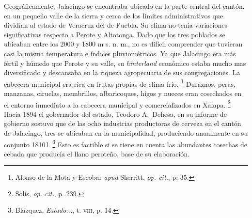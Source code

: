 \documentclass[14pt,twoside,final]{extbook} %
\let\oldfootnote\footnote
\renewcommand\footnote[1]{%
\oldfootnote{\hspace{1mm}#1}}
\begin{document}
Geográficamente, Jalacingo se encontraba ubicado en la parte central del cantón, en un pequeño valle de la sierra y cerca de los límites administrativos que dividían al estado de Veracruz del de Puebla. Su clima no tenía variaciones significativas respecto a Perote y Altotonga. Dado que los tres poblados se ubicaban entre los 2000 y 1800 m s. n. m., no es difícil comprender que tuvieran casi la misma temperatura e índices pluviométricos. Ya que Jalacingo era más fértil y húmedo que Perote y su valle, su \emph{hinterland} económico estaba mucho mas diversificado y descansaba en la riqueza agropecuaria de sus congregaciones. La cabecera municipal era rica en frutas propias de clima frío.\footnote{Alonso de la Mota y Escobar \emph{apud} Skerritt, \emph{op. cit.}, p. 35.} Duraznos, peras, manzanas, ciruelas, membrillos, albaricoques, higos y nueces eran cosechados en el entorno inmediato a la cabecera municipal y comercializados en Xalapa.\footnote{Solís, \emph{op. cit.}, p. 239.} Hacia 1894 el gobernador del estado, Teodoro A.~Dehesa, en su informe de gobierno sostuvo que de las ocho industrias productoras de cerveza en el cantón de Jalacingo, tres se ubicaban en la municipalidad, produciendo anualmente en su conjunto 1810\,l.\footnote{Blázquez, \emph{Estado...}, t. \textsc{viii}, p. 14.} Esto es factible si se tiene en cuenta las abundantes cosechas de cebada que producía el llano peroteño, base de su elaboración.
\end{document}
